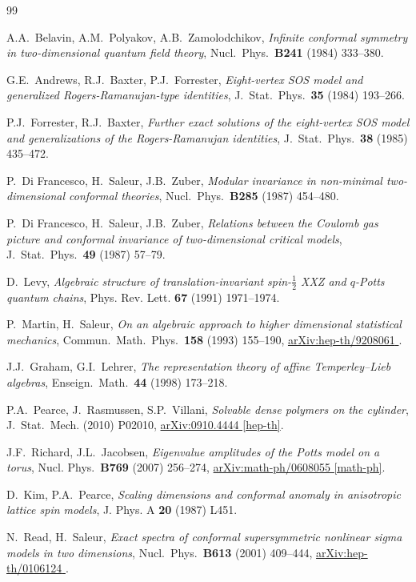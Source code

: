 \documentclass[11pt]{article}
\numberwithin{equation}{section}
\theoremstyle{definition}
\numberwithin{equation}{section}
\def\arxiv#1#2{\href{http://arxiv.org/abs/#1}{\textsf{arXiv:#1 #2}}}
\begin{document}
\begin{thebibliography}{99}

	A.A.~Belavin, A.M.~Polyakov, A.B.~Zamolodchikov,
	{\em Infinite conformal symmetry in two-dimensional quantum field theory},
	Nucl.~Phys.~{\bf B241} (1984) 333--380.
	
	G.E.~Andrews, R.J.~Baxter, P.J.~Forrester, 
	{\em Eight-vertex SOS model and generalized Rogers-Ramanujan-type identities}, 
	J.~Stat.~Phys.~{\bf 35} (1984) 193--266.

	P.J.~Forrester, R.J.~Baxter, 
	{\em Further exact solutions of the eight-vertex SOS model and generalizations of the Rogers-Ramanujan identities}, 
	J.~Stat.~Phys.~{\bf 38} (1985) 435--472.

	P.~Di Francesco, H.~Saleur, J.B.~Zuber,
	{\em Modular invariance in non-minimal two-dimensional conformal theories},
	Nucl.~Phys.~{\bf B285} (1987) 454--480.
	
	P.~Di Francesco, H.~Saleur, J.B.~Zuber,
	{\em Relations between the Coulomb gas picture and conformal invariance of two-dimensional critical models},
	J.~Stat.~Phys.~{\bf 49} (1987) 57--79.

	D.~Levy,
	{\em Algebraic structure of translation-invariant spin-$\frac12$ XXZ and $q$-Potts quantum chains},
	Phys. Rev. Lett. {\bf 67} (1991) 1971--1974.

	P.~Martin, H.~Saleur,
	{\em On an algebraic approach to higher dimensional statistical mechanics},
	Commun.~Math.~Phys.~{\bf 158} (1993) 155--190,
	\arxiv{hep-th/9208061}{\!\!}.
 
	J.J.~Graham, G.I.~Lehrer,
	{\em The representation theory of affine Temperley--Lieb algebras},
	Enseign.~Math.~{\bf 44} (1998) 173--218.

	P.A.~Pearce, J.~Rasmussen, S.P.~Villani, 
	{\em Solvable dense polymers on the cylinder}, 
	J.~Stat.~Mech. (2010) P02010,
	\arxiv{0910.4444}{[hep-th]}.

	J.F.~Richard, J.L.~Jacobsen, 
	{\em Eigenvalue amplitudes of the Potts model on a torus},
	Nucl. Phys.~{\bf B769} (2007) 256--274, 
	\arxiv{math-ph/0608055}{[math-ph]}.

	D.~Kim, P.A.~Pearce,
	{\em Scaling dimensions and conformal anomaly in anisotropic lattice spin models}, 
	J. Phys. A {\bf 20} (1987) L451.
        
	N.~Read, H.~Saleur,
	{\em Exact spectra of conformal supersymmetric nonlinear sigma models in two dimensions},	
	Nucl.~Phys.~{\bf B613} (2001) 409--444,
	\arxiv{hep-th/0106124}{\!\!}.
	

\end{thebibliography}
\end{document}
